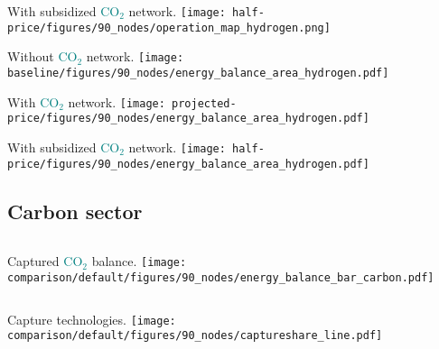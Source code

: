 \documentclass[12pt, aspectratio=169]{beamer}
\newcommand{\carbon}{\textcolor{teal}{CO$_2$}}
\begin{document}
\begin{frame}
    \begin{center}
    With subsidized \carbon{} network.
    \texttt{[image: half-price/figures/90\_nodes/operation\_map\_hydrogen.png]}
    \end{center}
\end{frame}


\begin{frame}
    \begin{center}
    Without \carbon{} network.
    \texttt{[image: baseline/figures/90\_nodes/energy\_balance\_area\_hydrogen.pdf]}
    \end{center}
\end{frame}


\begin{frame}
    \begin{center}
    With \carbon{} network.
    \texttt{[image: projected-price/figures/90\_nodes/energy\_balance\_area\_hydrogen.pdf]}
    \end{center}
\end{frame}


\begin{frame}
    \begin{center}
    With subsidized \carbon{} network.
    \texttt{[image: half-price/figures/90\_nodes/energy\_balance\_area\_hydrogen.pdf]}
    \end{center}
\end{frame}


\subsection*{Carbon sector}

\begin{frame}
    \begin{columns}
        Captured \carbon{} balance.
        \texttt{[image: comparison/default/figures/90\_nodes/energy\_balance\_bar\_carbon.pdf]}
    \end{columns}
\end{frame}

\begin{frame}
    \begin{columns}
        Capture technologies.
        \texttt{[image: comparison/default/figures/90\_nodes/captureshare\_line.pdf]}
    \end{columns}
\end{frame}
\end{document}
